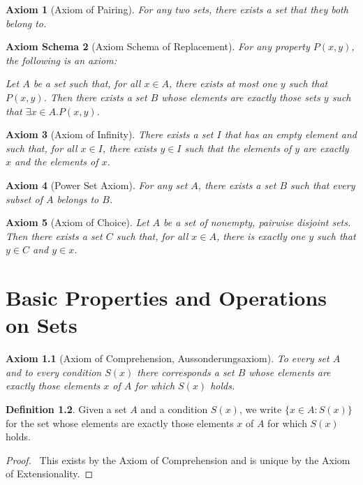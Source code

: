 \documentclass{report}
\let\qed\relax
\newtheorem{ax}{Axiom}[chapter]
\newtheorem{axs}[ax]{Axiom Schema}
\theoremstyle{definition}
\newtheorem{df}[ax]{Definition}
\begin{document}
\begin{ax}[Axiom of Pairing]
For any two sets, there exists a set that they both belong to.
\end{ax}

\begin{axs}[Axiom Schema of Replacement]
For any property $P(x,y)$, the following is an axiom:

Let $A$ be a set such that, for all $x \in A$, there exists at most one $y$ such that $P(x,y)$. Then there exists a set $B$ whose elements are exactly those sets $y$ such that $\exists x \in A. P(x,y)$.
\end{axs}

\begin{ax}[Axiom of Infinity]
There exists a set $I$ that has an empty element and such that, for all $x \in I$, there exists $y \in I$ such that the elements of $y$ are exactly $x$ and the elements of $x$.
\end{ax}

\begin{ax}[Power Set Axiom]
For any set $A$, there exists a set $B$ such that every subset of $A$ belongs to $B$.
\end{ax}

\begin{ax}[Axiom of Choice]
Let $A$ be a set of nonempty, pairwise disjoint sets. Then there exists a set $C$ such that, for all $x \in A$, there is exactly one $y$ such that $y \in C$ and $y \in x$.
\end{ax}

\chapter{Basic Properties and Operations on Sets}

\begin{ax}[Axiom of Comprehension, Aussonderungsaxiom]
To every set $A$ and to every condition $S(x)$ there corresponds a set $B$ whose elements are exactly those elements $x$ of $A$ for which $S(x)$ holds.
\end{ax}

\begin{df}
Given a set $A$ and a condition $S(x)$, we write $\{ x \in A : S(x) \}$ for the set whose elements are exactly those elements $x$ of $A$ for which $S(x)$ holds.
\end{df}

\begin{proof}
\pf\ This exists by the Axiom of Comprehension and is unique by the Axiom of Extensionality. \qed
\end{proof}
\end{document}
